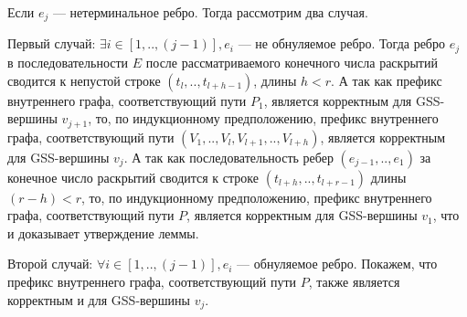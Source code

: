 Если $e_{j}$ --- нетерминальное ребро. Тогда рассмотрим два случая.

Первый случай: $\exists i \in [1,..,(j-1)], e_{i}$ --- не обнуляемое ребро. Тогда ребро $e_{j}$ в последовательности $E$ после рассматриваемого конечного числа раскрытий сводится к непустой строке $(t_{l},..,t_{l+h-1})$, длины $h < r$. А так как префикс внутреннего графа, соответствующий пути $P_{1}$, является корректным для GSS-вершины $v_{j+1}$, то, по индукционному предположению, префикс внутреннего графа, соответствующий пути $(V_{1},..,V_{l},V_{l+1},..,V_{l+h})$, является корректным для GSS-вершины $v_{j}$. А так как последовательность ребер $(e_{j-1},..,e_{1})$ за конечное число раскрытий сводится к строке $(t_{l+h},..,t_{l+r-1})$ длины $(r - h) < r$, то, по индукционному предположению, префикс внутреннего графа, соответствующий пути $P$, является корректным для GSS-вершины $v_{1}$, что и доказывает утверждение леммы.

Второй случай: $\forall i \in [1,..,(j-1)], e_{i}$ --- обнуляемое ребро. Покажем, что префикс внутреннего графа, соответствующий пути $P$, также является корректным и для GSS-вершины $v_{j}$.

